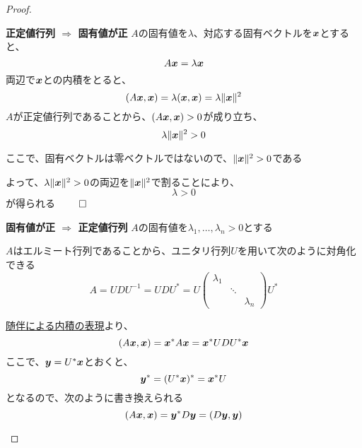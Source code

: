 \documentclass[../../../topic_linear-algebra]{subfiles}
\begin{document}
\begin{proof}
  \begin{subpattern}{\bfseries 正定値行列 $\Longrightarrow$ 固有値が正}
    $A$の固有値を$\lambda$、対応する固有ベクトルを$\vb*{x}$とすると、
    \begin{equation*}
      A\vb*{x} = \lambda \vb*{x}
    \end{equation*}
    両辺で$\vb*{x}$との内積をとると、
    \begin{equation*}
      (A\vb*{x}, \vb*{x}) = \lambda (\vb*{x}, \vb*{x}) = \lambda \|\vb*{x}\|^2
    \end{equation*}
    $A$が正定値行列であることから、$(A\vb*{x}, \vb*{x}) > 0$が成り立ち、
    \begin{equation*}
      \lambda \|\vb*{x}\|^2 > 0
    \end{equation*}

    \br

    ここで、固有ベクトルは零ベクトルではないので、$\|\vb*{x}\|^2 >0$である

    よって、$\lambda \|\vb*{x}\|^2 > 0$の両辺を$\|\vb*{x}\|^2$で割ることにより、
    \begin{equation*}
      \lambda > 0
    \end{equation*}
    が得られる $\qed$
  \end{subpattern}

  \begin{subpattern}{\bfseries 固有値が正 $\Longrightarrow$ 正定値行列}
    $A$の固有値を$\lambda_1,\ldots,\lambda_n >0$とする

    $A$はエルミート行列であることから、ユニタリ行列$U$を用いて次のように対角化できる
    \begin{equation*}
      A = U D U^{-1} = UDU^* = U \begin{pmatrix}
        \lambda_1 &        &           \\
                  & \ddots &           \\
                  &        & \lambda_n
      \end{pmatrix} U^*
    \end{equation*}

    \hyperref[thm:inner-product-adjoint-form]{随伴による内積の表現}より、
    \begin{equation*}
      (A\vb*{x}, \vb*{x}) = \vb*{x}^* A \vb*{x} = \vb*{x}^* U D U^* \vb*{x}
    \end{equation*}
    ここで、$\vb*{y} = U^* \vb*{x}$とおくと、
    \begin{equation*}
      \vb*{y}^* = (U^* \vb*{x})^* = \vb*{x}^* U
    \end{equation*}
    となるので、次のように書き換えられる
    \begin{equation*}
      (A\vb*{x}, \vb*{x}) = \vb*{y}^* D \vb*{y} = (D\vb*{y}, \vb*{y})
    \end{equation*}


\end{subpattern}
\end{proof}
\end{document}
